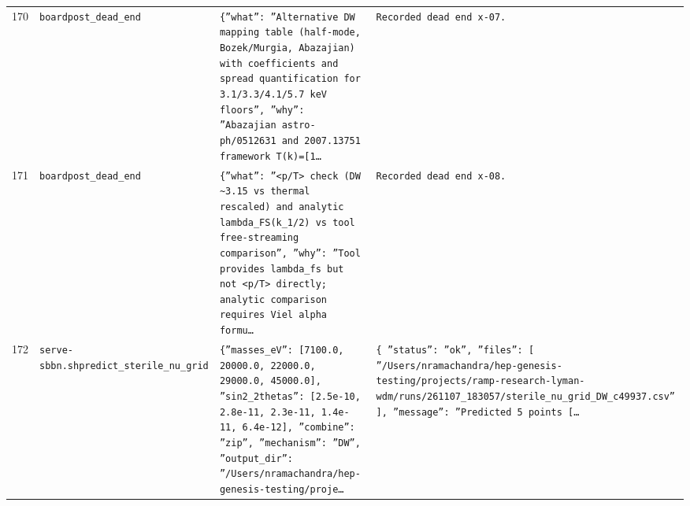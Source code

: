 \documentclass[11pt,a4paper]{article}
\begin{document}
\begin{longtable}{@{}p{}p{}p{}p{}@{}}
170 & \texttt{board}\newline\texttt{post\_\allowbreak{}dead\_\allowbreak{}end} & \texttt{\{''what'':\allowbreak{} ''Alternative DW mapping table (half-mode,\allowbreak{} Bozek/\allowbreak{}Murgia,\allowbreak{} Abazajian)\allowbreak{} with coefficients and spread quantification for 3.1/\allowbreak{}3.3/\allowbreak{}4.1/\allowbreak{}5.7 keV floors'',\allowbreak{} ''why'':\allowbreak{} ''Abazajian astro-ph/\allowbreak{}0512631 and 2007.13751 framework T(k)\allowbreak{}=\allowbreak{}[1\ldots{}\allowbreak{}} & \texttt{Recorded dead end x-07.} \\
171 & \texttt{board}\newline\texttt{post\_\allowbreak{}dead\_\allowbreak{}end} & \texttt{\{''what'':\allowbreak{} ''\textless{}\allowbreak{}p/\allowbreak{}T\textgreater{}\allowbreak{} check (DW \textasciitilde{}\allowbreak{}3.15 vs thermal rescaled)\allowbreak{} and analytic lambda\_\allowbreak{}FS(k\_\allowbreak{}1/\allowbreak{}2)\allowbreak{} vs tool free-streaming comparison'',\allowbreak{} ''why'':\allowbreak{} ''Tool provides lambda\_\allowbreak{}fs but not \textless{}\allowbreak{}p/\allowbreak{}T\textgreater{}\allowbreak{} directly;\allowbreak{} analytic comparison requires Viel alpha formu\ldots{}\allowbreak{}} & \texttt{Recorded dead end x-08.} \\
172 & \texttt{serve-sbbn.sh}\newline\texttt{predict\_\allowbreak{}sterile\_\allowbreak{}nu\_\allowbreak{}grid} & \texttt{\{''masses\_\allowbreak{}eV'':\allowbreak{} [7100.0,\allowbreak{} 20000.0,\allowbreak{} 22000.0,\allowbreak{} 29000.0,\allowbreak{} 45000.0]\allowbreak{},\allowbreak{} ''sin2\_\allowbreak{}2thetas'':\allowbreak{} [2.5e-10,\allowbreak{} 2.8e-11,\allowbreak{} 2.3e-11,\allowbreak{} 1.4e-11,\allowbreak{} 6.4e-12]\allowbreak{},\allowbreak{} ''combine'':\allowbreak{} ''zip'',\allowbreak{} ''mechanism'':\allowbreak{} ''DW'',\allowbreak{} ''output\_\allowbreak{}dir'':\allowbreak{} ''/\allowbreak{}Users/\allowbreak{}nramachandra/\allowbreak{}hep-genesis-testing/\allowbreak{}proje\ldots{}\allowbreak{}} & \texttt{\{   ''status'':\allowbreak{} ''ok'',\allowbreak{}   ''files'':\allowbreak{} [     ''/\allowbreak{}Users/\allowbreak{}nramachandra/\allowbreak{}hep-genesis-testing/\allowbreak{}projects/\allowbreak{}ramp-research-lyman-wdm/\allowbreak{}runs/\allowbreak{}261107\_\allowbreak{}183057/\allowbreak{}sterile\_\allowbreak{}nu\_\allowbreak{}grid\_\allowbreak{}DW\_\allowbreak{}c49937.csv''   ]\allowbreak{},\allowbreak{}   ''message'':\allowbreak{} ''Predicted 5 points [\ldots{}\allowbreak{}} \\

\end{longtable}
\end{document}
